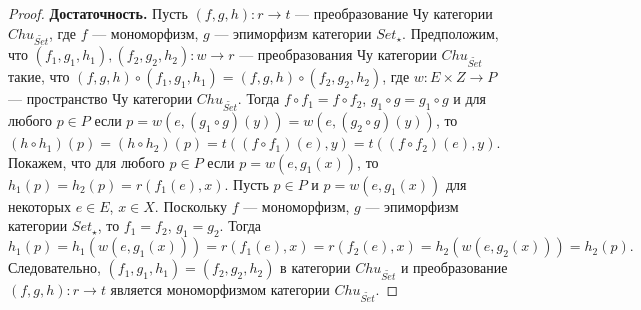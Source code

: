 \documentclass[a4paper,12pt]{article}
\begin{document}
\begin{proof}
    \textbf{Достаточность.} Пусть $(f,g,h): r \to t$ --- преобразование Чу категории $Chu_{\widetilde{Set}}$, где $f$ --- мономорфизм, $g$ --- эпиморфизм категории $Set_{\star}$. Предположим, что $(f_1,g_1,h_1), (f_2,g_2,h_2): w \to r$ --- преобразования Чу категории $Chu_{\widetilde{Set}}$ такие, что $(f,g,h) \circ (f_1,g_1,h_1) = (f,g,h) \circ (f_2,g_2,h_2)$, где $w: E \times Z \to P$ --- пространство Чу категории $Chu_{\widetilde{Set}}$. Тогда $f \circ f_1 = f \circ f_2$, $g_1 \circ g = g_1 \circ g$ и для любого $p \in P$ если $p = w(e,(g_1 \circ g)(y)) = w(e,(g_2 \circ g)(y))$, то $(h \circ h_1)(p) = (h \circ h_2)(p) = t((f \circ f_1)(e), y) = t((f \circ f_2)(e), y)$. Покажем, что для любого $p \in P$ если $p = w(e,g_1(x))$, то $h_1(p) = h_2(p) = r(f_1(e),x)$. Пусть $p \in P$ и $p = w(e,g_1(x))$ для некоторых $e \in E$, $x \in X$. Поскольку $f$ --- мономорфизм, $g$ --- эпиморфизм категории $Set_{\star}$, то $f_1 = f_2$, $g_1 = g_2$. Тогда 
    $$
        h_1(p) = h_1(w(e,g_1(x))) = r(f_1(e),x) = r(f_2(e),x) = h_2(w(e,g_2(x))) = h_2(p).
    $$
    Следовательно, $(f_1,g_1,h_1) = (f_2,g_2,h_2)$ в категории $Chu_{\widetilde{Set}}$ и преобразование $(f,g,h): r \to t$ является мономорфизмом категории $Chu_{\widetilde{Set}}$.
\end{proof}
\end{document}
